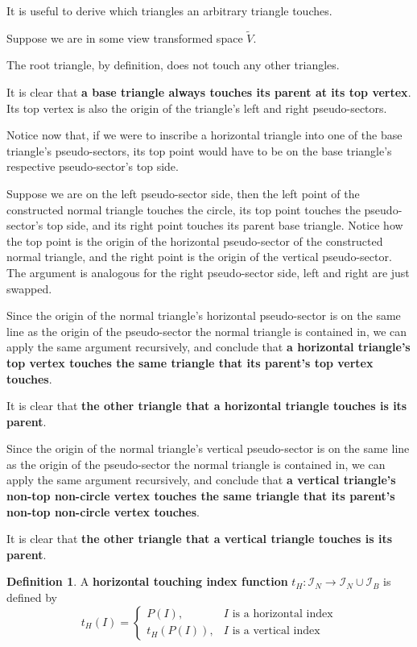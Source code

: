 \documentclass[a4paper,12pt]{article}
\newcommand{\HSview}[1][V]{\widetilde{#1}}
\theoremstyle{definition}
\newtheorem{definition}[theorem]{Definition}
\theoremstyle{plain}
\begin{document}
	It is useful to derive which triangles an arbitrary triangle touches.
	
	Suppose we are in some view transformed space $\HSview$.

	The root triangle, by definition, does not touch any other triangles.

	It is clear that \textbf{a base triangle always touches its parent at its top vertex}. Its top vertex is also the origin of the triangle's left and right pseudo-sectors.

	Notice now that, if we were to inscribe a horizontal triangle into one of the base triangle's pseudo-sectors,
	its top point would have to be on the base triangle's respective pseudo-sector's top side.

	Suppose we are on the left pseudo-sector side, then the left point of the constructed normal triangle touches the circle,
	its top point touches the pseudo-sector's top side, and its right point touches its parent base triangle.
	Notice how the top point is the origin of the horizontal pseudo-sector of the constructed normal triangle, and the right point is the origin of the vertical pseudo-sector.
	The argument is analogous for the right pseudo-sector side, left and right are just swapped.

	Since the origin of the normal triangle's horizontal pseudo-sector is on the same line as the origin of the pseudo-sector the normal triangle is contained in,
	we can apply the same argument recursively, and conclude that
	\textbf{a horizontal triangle's top vertex touches the same triangle that its parent's top vertex touches}.
	
	It is clear that \textbf{the other triangle that a horizontal triangle touches is its parent}.

	Since the origin of the normal triangle's vertical pseudo-sector is on the same line as the origin of the pseudo-sector the normal triangle is contained in, we can
	apply the same argument recursively, and conclude that
	\textbf{a vertical triangle's non-top non-circle vertex touches the same triangle that its parent's non-top non-circle vertex touches}.
	
	It is clear that \textbf{the other triangle that a vertical triangle touches is its parent}.

	\begin{definition}
		A \textbf{horizontal touching index function} $t_H : \mathcal{I}_N \to \mathcal{I}_N \cup \mathcal{I}_B$ is defined by
		$$t_H(I) = \begin{cases}
			P(I),      & I \text{ is a horizontal index}\\
			t_H(P(I)), & I \text{ is a vertical index}
		\end{cases}$$
	\end{definition}
	
\end{document}

